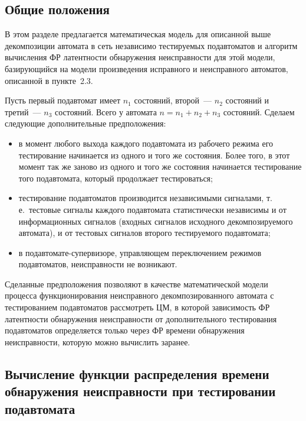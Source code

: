 \begin{multicols}{2}
\subsection{Общие положения}

 В этом разделе предлагается математическая модель для описанной
выше декомпозиции автомата в сеть независимо тестируемых подавтоматов и
алгоритм вычисления ФР латентности обнаружения неисправности для этой модели,
базирующийся на модели произведения исправного и неисправного автоматов,
описанной в пункте~2.3.

 Пусть первый подавтомат имеет $n_1$ со\-сто\-яний, второй~--- $n_2$
со\-сто\-яний и третий~--- $n_3$ со\-сто\-яний.
Всего у автомата $n=n_1+n_2+n_3$ со\-сто\-яний.
Сделаем следующие дополнительные предположения:
\begin{itemize}
\item
 в момент любого выхода каждого подавтомата из рабочего режима его
тестирование начинается из одного и того же состояния.
Более того, в этот момент так же заново из одного и того же состояния
начинается тестирование того под\-ав\-то\-ма\-та, который продолжает тестироваться;
\item
 тестирование подавтоматов производится независимыми сигналами,
т.\,е.\ тестовые сигналы каждого подавтомата статистически независимы и от
информационных сигналов (входных сигналов исходного декомпозируемого
автомата), и от тестовых сигналов второго тес\-ти\-ру\-емо\-го подавтомата;
\item
 в подавтомате-супервизоре, управляющем переключением режимов
подавтоматов, неисправности не возникают.
\end{itemize}

Сделанные предположения позволяют в качестве математической модели
процесса функционирования неисправного декомпозированного автомата с
тестированием подавтоматов рассмотреть ЦМ, в которой зависимость
ФР латентности обнаружения неисправности от дополнительного тестирования
подавтоматов определяется только через ФР времени обнаружения
неисправности, которую можно вычислить заранее.

\subsection{Вычисление функции распределения времени обнаружения
неисправности при тестировании подавтомата}


\end{multicols}
